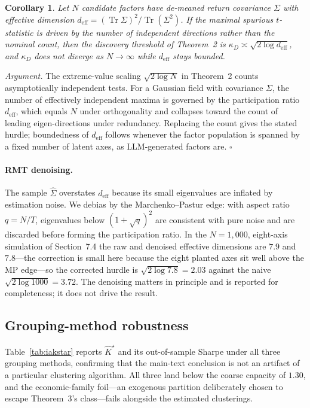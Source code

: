 \documentclass[12pt]{article}
\theoremstyle{plain}
\newtheorem{corollary}{Corollary}
\theoremstyle{definition}
\begin{document}
\begin{corollary}
Let $N$ candidate factors have de-meaned return covariance $\Sigma$ with
effective dimension $d_{\text{eff}}=(\operatorname{Tr}\Sigma)^2/
\operatorname{Tr}(\Sigma^2)$. If the maximal spurious $t$-statistic is driven by
the number of \emph{independent} directions rather than the nominal count, then
the discovery threshold of Theorem~2 is
$\kappa_D\asymp\sqrt{2\log d_{\text{eff}}}$, and $\kappa_D$ does not diverge as
$N\to\infty$ while $d_{\text{eff}}$ stays bounded.
\end{corollary}

\emph{Argument.} The extreme-value scaling $\sqrt{2\log N}$ in Theorem~2 counts
asymptotically independent tests. For a Gaussian field with covariance $\Sigma$,
the number of effectively independent maxima is governed by the participation
ratio $d_{\text{eff}}$, which equals $N$ under orthogonality and collapses toward
the count of leading eigen-directions under redundancy. Replacing the count gives
the stated hurdle; boundedness of $d_{\text{eff}}$ follows whenever the factor
population is spanned by a fixed number of latent axes, as LLM-generated factors
are. $\square$

\paragraph{RMT denoising.} The sample $\widehat\Sigma$ overstates
$d_{\text{eff}}$ because its small eigenvalues are inflated by estimation noise.
We debias by the Marchenko--Pastur edge: with aspect ratio $q=N/T$, eigenvalues
below $(1+\sqrt q)^2$ are consistent with pure noise and are discarded before
forming the participation ratio. In the $N=1{,}000$, eight-axis simulation of
Section~7.4 the raw and denoised effective dimensions are $7.9$ and $7.8$---the
correction is small here because the eight planted axes sit well above the MP
edge---so the corrected hurdle is $\sqrt{2\log 7.8}=2.03$ against the naive
$\sqrt{2\log 1000}=3.72$. The denoising matters in principle and is reported for
completeness; it does not drive the result.
\subsection{Grouping-method robustness}
\label{ia:robust-grouping}

Table~\ref{tab:iakstar} reports $\hat K^\star$ and its out-of-sample Sharpe under
all three grouping methods, confirming that the main-text conclusion is not an
artifact of a particular clustering algorithm. All three land below the coarse
capacity of $1.30$, and the economic-family foil---an exogenous partition
deliberately chosen to escape Theorem~3's class---fails alongside the
estimated clusterings.
\end{document}
